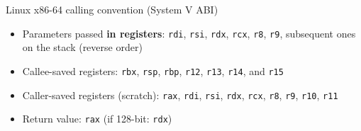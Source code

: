 \documentclass[]{beamer}
\begin{document}
\begin{frame}{Linux x86-64 calling convention (System V ABI)}
\begin{itemize}
\item Parameters passed {\bf in registers}: {\tt rdi}, {\tt rsi}, {\tt rdx}, {\tt rcx}, {\tt r8}, {\tt r9}, subsequent ones on the stack (reverse order)
\item Callee-saved registers: {\tt rbx}, {\tt rsp}, {\tt rbp}, {\tt r12}, {\tt r13}, {\tt r14}, and {\tt r15}
\item Caller-saved registers (scratch): {\tt rax}, {\tt rdi}, {\tt rsi}, {\tt rdx}, {\tt rcx}, {\tt r8}, {\tt r9}, {\tt r10}, {\tt r11}
\item Return value: {\tt rax} (if 128-bit: {\tt rdx})
\end{itemize}
\end{frame}
\end{document}
